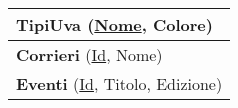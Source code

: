 \begin{center}
\begin{minipage}[t]{7.5cm}
{\begin{tabular}{P{7.5cm}}
				 \textbf{TipiUva} (\underline{Nome}, Colore)                                                                           \\                                
				\midrule

				 \textbf{Corrieri} (\underline{Id}, Nome)                                                                              \\                                
				\midrule

				 \textbf{Eventi} (\underline{Id}, Titolo, Edizione)                                                                    \\
				\midrule
			\end{tabular}
		}
	\end{minipage}
\end{center}


